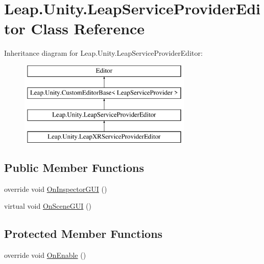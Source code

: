 \hypertarget{class_leap_1_1_unity_1_1_leap_service_provider_editor}{}\section{Leap.\+Unity.\+Leap\+Service\+Provider\+Editor Class Reference}
\label{class_leap_1_1_unity_1_1_leap_service_provider_editor}
Inheritance diagram for Leap.\+Unity.\+Leap\+Service\+Provider\+Editor\+:\begin{figure}[H]
\begin{center}
\leavevmode
\includegraphics[height=4.000000cm]{class_leap_1_1_unity_1_1_leap_service_provider_editor}
\end{center}
\end{figure}
\subsection*{Public Member Functions}
\begin{DoxyCompactItemize}
\item 
override void \mbox{\hyperlink{class_leap_1_1_unity_1_1_leap_service_provider_editor_ae7198f5589929f399b0956e271139494}{On\+Inspector\+G\+UI}} ()
\item 
virtual void \mbox{\hyperlink{class_leap_1_1_unity_1_1_leap_service_provider_editor_a25d4ecd6fae74e7fd8bf6d358fe93568}{On\+Scene\+G\+UI}} ()
\end{DoxyCompactItemize}
\subsection*{Protected Member Functions}
\begin{DoxyCompactItemize}
\item 
override void \mbox{\hyperlink{class_leap_1_1_unity_1_1_leap_service_provider_editor_ab843b1617ce2fff5b73493530fc4e959}{On\+Enable}} ()
\end{DoxyCompactItemize}
